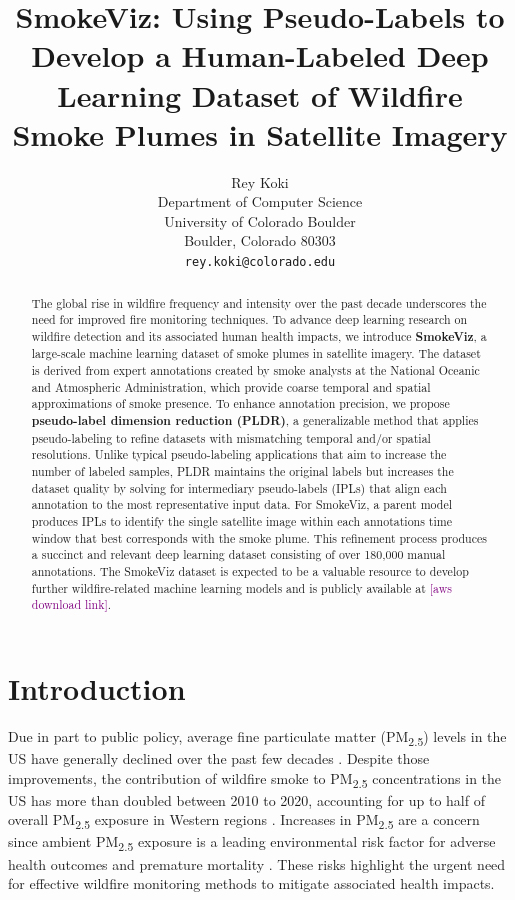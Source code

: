 \documentclass{article}
\title{SmokeViz: Using Pseudo-Labels to Develop a Human-Labeled Deep Learning Dataset of Wildfire Smoke Plumes in Satellite Imagery}
\author{%
  Rey Koki\\%
  Department of Computer Science\\
  University of Colorado Boulder\\
  Boulder, Colorado 80303\\
  \texttt{rey.koki@colorado.edu} \\
}
\newcommand\reynotes[1]{\textcolor{purple}{#1}}
\begin{document}
\maketitle


\begin{abstract}
    The global rise in wildfire frequency and intensity over the past decade underscores the need for improved fire monitoring techniques. To advance deep learning research on wildfire detection and its associated human health impacts, we introduce \textbf{SmokeViz}, a large-scale machine learning dataset of smoke plumes in satellite imagery. The dataset is derived from expert annotations created by smoke analysts at the National Oceanic and Atmospheric Administration, which provide coarse temporal and spatial approximations of smoke presence. To enhance annotation precision, we propose \textbf{pseudo-label dimension reduction (PLDR)}, a generalizable method that applies pseudo-labeling to refine datasets with mismatching temporal and/or spatial resolutions. Unlike typical pseudo-labeling applications that aim to increase the number of labeled samples, PLDR maintains the original labels but increases the dataset quality by solving for intermediary pseudo-labels (IPLs) that align each annotation to the most representative input data. For SmokeViz, a parent model produces IPLs to identify the single satellite image within each annotations time window that best corresponds with the smoke plume. This refinement process produces a succinct and relevant deep learning dataset consisting of over 180,000 manual annotations. The SmokeViz dataset is expected to be a valuable resource to develop further wildfire-related machine learning models and is publicly available at \reynotes{[aws download link]}.  
\end{abstract}


\section{Introduction}

Due in part to public policy, average fine particulate matter (PM\textsubscript{2.5}) levels in the US have generally declined over the past few decades \cite{clean_air_act}. Despite those improvements, the contribution of wildfire smoke to PM\textsubscript{2.5} concentrations in the US has more than doubled between 2010 to 2020, accounting for up to half of overall PM\textsubscript{2.5} exposure in Western regions \cite{smoke_PM}. Increases in PM\textsubscript{2.5} are a concern since ambient PM\textsubscript{2.5} exposure is a leading environmental risk factor for adverse health outcomes and premature mortality \cite{smoke_mortality}. These risks highlight the urgent need for effective wildfire monitoring methods to mitigate associated health impacts. 
\end{document}
